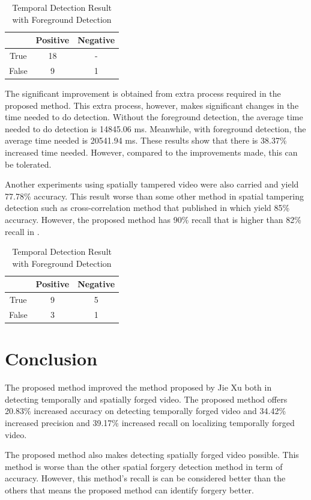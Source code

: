 \documentclass[conference]{IEEEtran}
\begin{document}
\begin{table}[htbp]
\centering
\caption{Temporal Detection Result with Foreground Detection}
\begin{tabular}{|c|c|c|}
\hline
& Positive & Negative \\
\hline
True & 18& -\\
\hline
False & 9& 1\\
\hline
\end{tabular}
\label{tabtlw}
\end{table}

The significant improvement is obtained from extra process required in the proposed method. This extra process, however, makes significant changes in the time needed to do detection. Without the foreground detection, the average time needed to do detection is 14845.06 ms. Meanwhile, with foreground detection, the average time needed is 20541.94 ms. These results show that there is 38.37\% increased time needed. However, compared to the improvements made, this can be tolerated.

Another experiments using spatially tampered video were also carried and yield 77.78\% accuracy. This result worse than some other method in spatial tampering detection such as cross-correlation method that published in \cite{crosscorrelation} which yield 85\% accuracy. However, the proposed method has 90\% recall that is higher than 82\% recall in \cite{crosscorrelation}.

\begin{table}[htbp]
\centering
\caption{Temporal Detection Result with Foreground Detection}
\begin{tabular}{|c|c|c|}
\hline
& Positive & Negative \\
\hline
True & 9& 5\\
\hline
False & 3& 1\\
\hline
\end{tabular}
\label{tabsd}
\end{table}

\section{Conclusion}
The proposed method improved the method proposed by Jie Xu both in detecting temporally and spatially forged video. The proposed method offers 20.83\% increased accuracy on detecting temporally forged video and 34.42\% increased precision and 39.17\% increased recall on localizing temporally forged video.

The proposed method also makes detecting spatially forged video possible. This method is worse than the other spatial forgery detection method in term of accuracy. However, this method's recall is can be considered better than the others that means the proposed method can identify forgery better.
\end{document}
